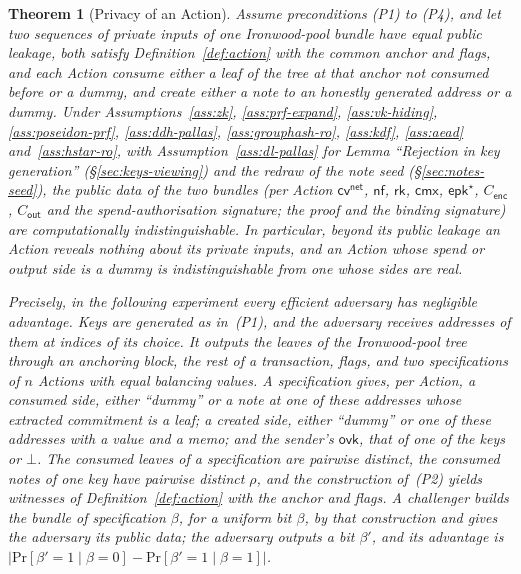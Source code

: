 \documentclass[11pt,a4paper]{article}
\newtheorem{theorem}{Theorem}[section]
\theoremstyle{definition}
\renewcommand{\Pr}{\mathrm{Pr}}
\newcommand{\nfsym}{\mathsf{nf}}
\newcommand{\cmx}{\mathsf{cmx}}
\newcommand{\cvsym}{\mathsf{cv}}
\newcommand{\rk}{\mathsf{rk}}
\newcommand{\ovk}{\ensuremath{\mathsf{ovk}}}
\begin{document}
\begin{theorem}[Privacy of an Action]\label{thm:privacy}
Assume preconditions (P1) to (P4), and let two sequences of private inputs
of one Ironwood-pool bundle have equal public leakage, both satisfy
Definition~\ref{def:action} with the common anchor and flags, and each
Action consume either a leaf of the tree at that anchor not consumed before
or a dummy, and create either a note to an honestly generated address or a
dummy. Under Assumptions~\ref{ass:zk}, \ref{ass:prf-expand},
\ref{ass:vk-hiding}, \ref{ass:poseidon-prf}, \ref{ass:ddh-pallas},
\ref{ass:grouphash-ro}, \ref{ass:kdf}, \ref{ass:aead}
and~\ref{ass:hstar-ro}, with Assumption~\ref{ass:dl-pallas} for Lemma
``Rejection in key generation'' (\S\ref{sec:keys-viewing}) and the redraw of
the note seed (\S\ref{sec:notes-seed}), the public data of the two
bundles (per Action $\cvsym^{\mathsf{net}}$, $\nfsym$, $\rk$, $\cmx$,
$\mathsf{epk}^{\star}$, $C_{\mathsf{enc}}$, $C_{\mathsf{out}}$ and the
spend-authorisation signature; the proof and the binding signature) are
computationally indistinguishable. In particular, beyond its public leakage
an Action reveals nothing about its private inputs, and an Action whose
spend or output side is a dummy is indistinguishable from one whose sides
are real.

Precisely, in the following experiment every efficient adversary has
negligible advantage. Keys are generated as in~(P1), and the adversary
receives addresses of them at indices of its choice. It outputs the leaves
of the Ironwood-pool tree through an anchoring block, the rest of a
transaction, flags, and two specifications of $n$ Actions with equal
balancing values. A specification gives, per Action, a consumed side,
either ``dummy'' or a note at one of these addresses whose extracted
commitment is a leaf; a created side, either ``dummy'' or one of these
addresses with a value and a memo; and the sender's $\ovk$, that of one of
the keys or $\bot$. The consumed leaves of a specification are pairwise
distinct, the consumed notes of one key have pairwise distinct $\rho$, and
the construction of~(P2) yields witnesses of Definition~\ref{def:action}
with the anchor and flags. A challenger builds the bundle of specification
$\beta$, for a uniform bit $\beta$, by that construction and gives the
adversary its public data; the adversary outputs a bit $\beta'$, and its
advantage is $|\Pr[\beta' = 1 \mid \beta = 0] -
\Pr[\beta' = 1 \mid \beta = 1]|$.
\end{theorem}
\end{document}
